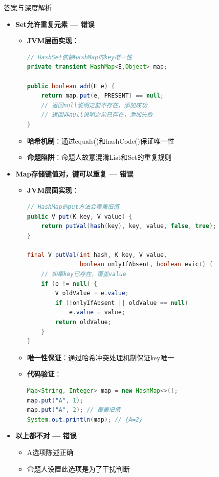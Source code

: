 \documentclass[12pt, a4paper]{ctexart}
\begin{document}
\begin{enumerate}[label=\textbf{\arabic*.}]
\begin{bluebox}{答案与深度解析}
\begin{itemize}[leftmargin=*, nosep, label={}]
			      \item[B] \textbf{Set允许重复元素 — 错误}
			            \begin{itemize}[label={}, leftmargin=*, nosep]
				            \item \textbf{JVM层面实现}：
				                  \begin{lstlisting}[language=Java]
// HashSet依赖HashMap的key唯一性
private transient HashMap<E,Object> map;

public boolean add(E e) {
    return map.put(e, PRESENT) == null;
    // 返回null说明之前不存在，添加成功
    // 返回非null说明之前已存在，添加失败
}
				      \end{lstlisting}
				            \item \textbf{哈希机制}：通过equals()和hashCode()保证唯一性
				            \item \textbf{命题陷阱}：命题人故意混淆List和Set的重复规则
			            \end{itemize}

			      \item[C] \textbf{Map存储键值对，键可以重复 — 错误}
			            \begin{itemize}[label={}, leftmargin=*, nosep]
				            \item \textbf{JVM层面实现}：
				                  \begin{lstlisting}[language=Java]
// HashMap的put方法会覆盖旧值
public V put(K key, V value) {
    return putVal(hash(key), key, value, false, true);
}

final V putVal(int hash, K key, V value,
               boolean onlyIfAbsent, boolean evict) {
    // 如果key已存在，覆盖value
    if (e != null) {
        V oldValue = e.value;
        if (!onlyIfAbsent || oldValue == null)
            e.value = value;
        return oldValue;
    }
}
				      \end{lstlisting}
				            \item \textbf{唯一性保证}：通过哈希冲突处理机制保证key唯一
				            \item \textbf{代码验证}：
				                  \begin{lstlisting}[language=Java]
Map<String, Integer> map = new HashMap<>();
map.put("A", 1);
map.put("A", 2); // 覆盖旧值
System.out.println(map); // {A=2}
				      \end{lstlisting}
			            \end{itemize}

			      \item[D] \textbf{以上都不对 — 错误}
			            \begin{itemize}[label={}, leftmargin=*, nosep]
				            \item A选项陈述正确
				            \item 命题人设置此选项是为了干扰判断
			            \end{itemize}
		      \end{itemize}


\end{bluebox}
\end{enumerate}
\end{document}
